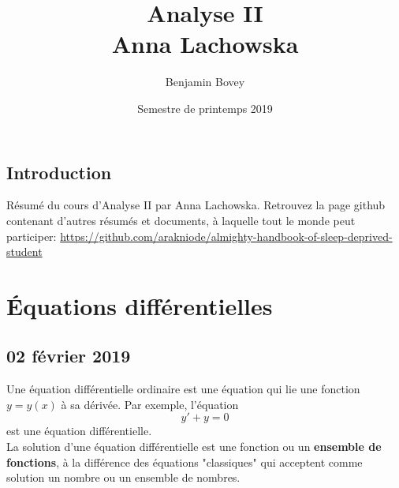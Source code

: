\documentclass{report}
\title{Analyse II \\ Anna Lachowska}
\author{Benjamin Bovey}
\date{Semestre de printemps 2019}
\theoremstyle{plain}
\theoremstyle{definition}
\theoremstyle{remark}
\begin{document}
\section*{Introduction}
Résumé du cours d'Analyse II par Anna Lachowska. Retrouvez la page github contenant d'autres résumés et documents, à laquelle tout le monde peut participer: \url{https://github.com/arakniode/almighty-handbook-of-sleep-deprived-student}

\chapter{Équations différentielles}

\section{02 février 2019}
Une équation différentielle ordinaire est une équation qui lie une fonction $y = y(x)$ à sa dérivée. Par exemple, l'équation
\begin{equation}
	y' + y = 0
\end{equation}
est une équation différentielle. 
\\
La solution d'une équation différentielle est une fonction ou un \textbf{ensemble de fonctions}, à la différence des équations "classiques" qui acceptent comme solution un nombre ou un ensemble de nombres. 
\end{document}
